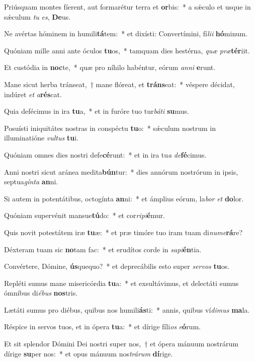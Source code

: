 \item Priúsquam montes fíerent, aut formarétur terra et \textbf{or}bis:~* a sǽculo et usque in sǽculum \textit{tu} \textit{es}, \textbf{De}us.
\item Ne avértas hóminem in humili\textbf{tá}tem:~* et dixísti: Convertímini, fí\textit{li}\textit{i} \textbf{hó}minum.
\item Quóniam mille anni ante óculos \textbf{tu}os,~* tamquam dies hestérna, \textit{quæ} \textit{præ}\textbf{tér}iit.
\item Et custódia in \textbf{noc}te,~* quæ pro níhilo habéntur, eórum \textit{an}\textit{ni} \textbf{e}runt.
\item Mane sicut herba tránseat,~† mane flóreat, et \textbf{tráns}eat:~* véspere décidat, indúret \textit{et} \textit{a}\textbf{rés}cat.
\item Quia defécimus in ira \textbf{tu}a,~* et in furóre tuo tur\textit{bá}\textit{ti} \textbf{su}mus.
\item Posuísti iniquitátes nostras in conspéctu \textbf{tu}o:~* sǽculum nostrum in illuminatióne \textit{vul}\textit{tus} \textbf{tu}i.
\item Quóniam omnes dies nostri defe\textbf{cé}runt:~* et in ira tu\textit{a} \textit{de}\textbf{fé}cimus.
\item Anni nostri sicut aránea medita\textbf{bún}tur:~* dies annórum nostrórum in ipsis, septua\textit{gín}\textit{ta} \textbf{an}ni.
\item Si autem in potentátibus, octogínta \textbf{an}ni:~* et ámplius eórum, la\textit{bor} \textit{et} \textbf{do}lor.
\item Quóniam supervénit mansue\textbf{tú}do:~* et cor\textit{ri}\textit{pi}\textbf{é}mur.
\item Quis novit potestátem iræ \textbf{tu}æ:~* et præ timóre tuo iram tuam di\textit{nu}\textit{me}\textbf{rá}re?
\item Déxteram tuam sic \textbf{no}tam fac:~* et erudítos corde in \textit{sa}\textit{pi}\textbf{én}tia.
\item Convértere, Dómine, \textbf{ús}quequo?~* et deprecábilis esto super \textit{ser}\textit{vos} \textbf{tu}os.
\item Repléti sumus mane misericórdia \textbf{tu}a:~* et exsultávimus, et delectáti sumus ómnibus di\textit{é}\textit{bus} \textbf{nos}tris.
\item Lætáti sumus pro diébus, quibus nos humili\textbf{ás}ti:~* annis, quibus ví\textit{di}\textit{mus} \textbf{ma}la.
\item Réspice in servos tuos, et in ópera \textbf{tu}a:~* et dírige fíli\textit{os} \textit{e}\textbf{ó}rum.
\item Et sit splendor Dómini Dei nostri super nos,~† et ópera mánuum nostrárum dírige \textbf{su}per nos:~* et opus mánuum nos\textit{trá}\textit{rum} \textbf{dí}rige.
